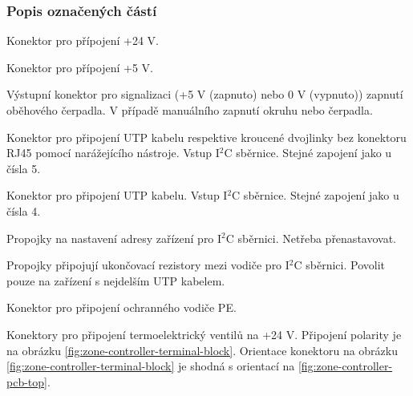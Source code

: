 \begin{Czech}
\subsubsection{Popis označených částí}
\end{Czech}

\begin{Czech}
Konektor pro přípojení +24 V.
\end{Czech}

\begin{Czech}
Konektor pro přípojení +5 V.
\end{Czech}

\begin{Czech}
Výstupní konektor pro signalizaci (+5 V (zapnuto) nebo 0 V (vypnuto)) zapnutí oběhového čerpadla. V případě manuálního zapnutí okruhu nebo čerpadla.
\end{Czech}

\begin{Czech}
Konektor pro připojení UTP kabelu respektive kroucené dvojlinky bez konektoru RJ45 pomocí narážejícího nástroje. Vstup I$^2$C sběrnice. Stejné zapojení jako u čísla 5.
\end{Czech}

\newpage
\begin{Czech}
Konektor pro připojení UTP kabelu. Vstup I$^2$C sběrnice. Stejné zapojení jako u čísla 4.
\end{Czech}

\begin{Czech}
Propojky na nastavení adresy zařízení pro I$^2$C sběrnici. Netřeba přenastavovat.
\end{Czech}

\begin{Czech}
Propojky připojují ukončovací rezistory mezi vodiče pro I$^2$C sběrnici. Povolit pouze na zařízení s nejdelším UTP kabelem.
\end{Czech}

\begin{Czech}
Konektor pro připojení ochranného vodiče PE.
\end{Czech}

\begin{Czech}
Konektory pro připojení termoelektrický ventilů na +24 V. Připojení polarity je na obrázku \ref{fig:zone-controller-terminal-block}. Orientace konektoru na obrázku \ref{fig:zone-controller-terminal-block} je shodná s orientací na \ref{fig:zone-controller-pcb-top}.
\end{Czech}

